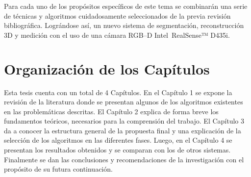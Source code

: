 Para cada uno de los propósitos específicos de este tema se combinarán una serie de técnicas y algoritmos cuidadosamente seleccionados de la previa revisión bibliográfica. Lográndose así, un nuevo sistema de segmentación, reconstrucción 3D y medición con el uso de una cámara RGB–D Intel~\textregistered RealSense™ D435i.

\section*{Organización de los Capítulos}

Esta tesis cuenta con un total de 4 Capítulos. En el Capítulo 1 se expone la revisión de la literatura donde se presentan algunos de los algoritmos existentes en las problemáticas descritas. El Capítulo 2 explica de forma breve los fundamentos teóricos, necesarios para la comprensión del trabajo. El Capítulo 3 da a conocer la estructura general de la propuesta final y una explicación de la selección de los algoritmos en las diferentes fases. Luego, en el Capítulo 4 se presentan los resultados obtenidos y se comparan con los de otros sistemas. Finalmente se dan las conclusiones y recomendaciones de la investigación con el propósito de su futura continuación.